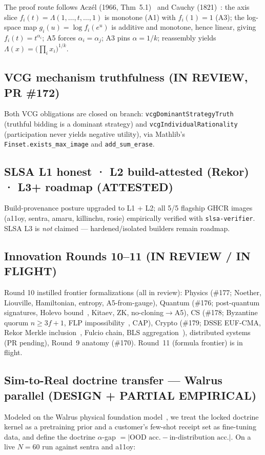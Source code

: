 \documentclass[11pt]{article}
\begin{document}
The proof route follows Acz\'el (1966, Thm~5.1)~\cite{aczel1966} and Cauchy (1821)~\cite{cauchy1821}:
the axis slice $f_i(t)=\Lambda(1,\dots,t,\dots,1)$ is monotone (A1) with $f_i(1)=1$ (A3); the log-space
map $g_i(u)=\log f_i(e^u)$ is additive and monotone, hence linear, giving $f_i(t)=t^{\alpha_i}$; A5 forces
$\alpha_i=\alpha_j$; A3 pins $\alpha=1/k$; reassembly yields $\Lambda(x)=\bigl(\prod_i x_i\bigr)^{1/k}$.

\subsection{VCG mechanism truthfulness (IN REVIEW, PR \#172)}
Both VCG obligations are closed on branch: \texttt{vcgDominantStrategyTruth} (truthful bidding is a
dominant strategy) and \texttt{vcgIndividualRationality} (participation never yields negative utility),
via Mathlib's \texttt{Finset.exists\_max\_image} and \texttt{add\_sum\_erase}.

\subsection{SLSA L1 honest · L2 build-attested (Rekor) · L3+ roadmap (ATTESTED)}
Build-provenance posture upgraded to L1 + L2; all 5/5 flagship GHCR images (a11oy, sentra, amaru,
killinchu, rosie) empirically verified with \texttt{slsa-verifier}. SLSA L3 is \emph{not} claimed ---
hardened/isolated builders remain roadmap.

\subsection{Innovation Rounds 10--11 (IN REVIEW / IN FLIGHT)}
Round 10 instilled frontier formalizations (all in review): Physics (\#177; Noether, Liouville,
Hamiltonian, entropy, A5-from-gauge), Quantum (\#176; post-quantum signatures, Holevo
bound~\cite{holevo1973}, Kitaev, ZK, no-cloning$\to$A5), CS (\#178; Byzantine quorum $n\ge 3f+1$,
FLP impossibility~\cite{flp1985}, CAP), Crypto (\#179; DSSE EUF-CMA, Rekor Merkle
inclusion~\cite{rfc6962}, Fulcio chain, BLS aggregation~\cite{bls2001}), distributed systems (PR
pending), Round~9 anatomy (\#170). Round~11 (formula frontier) is in flight.

\subsection{Sim-to-Real doctrine transfer --- Walrus parallel (DESIGN + PARTIAL EMPIRICAL)}
Modeled on the Walrus physical foundation model~\cite{walrus2025}, we treat the locked doctrine kernel
as a pretraining prior and a customer's few-shot receipt set as fine-tuning data, and define the doctrine
$\alpha$-gap $=\lvert\text{OOD acc.}-\text{in-distribution acc.}\rvert$. On a live $N{=}60$ run against
sentra and a11oy:
\end{document}
